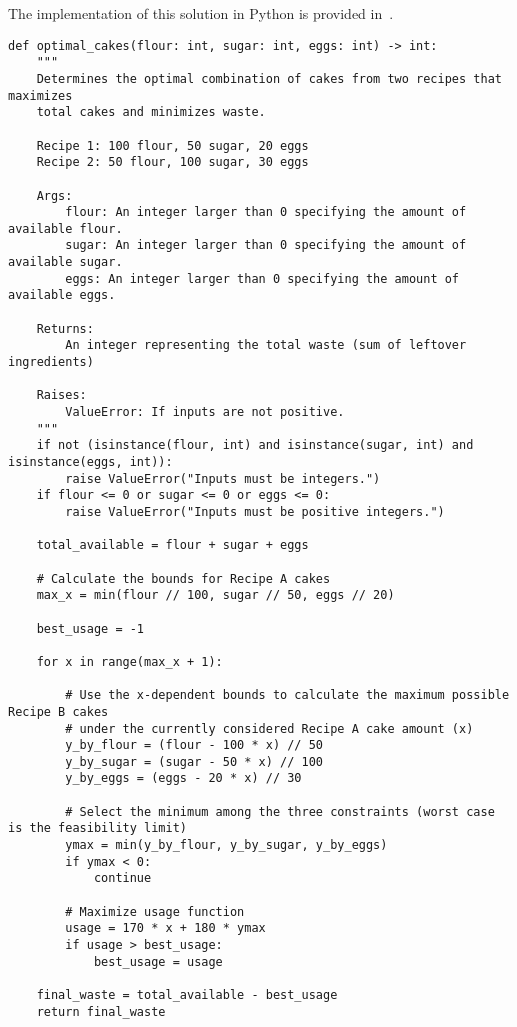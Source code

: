 \documentclass{solutionclass} %
\begin{document}
    The implementation of this solution in Python is provided in~.

    \clearpage

    \begin{lstlisting}[style=pythonstyle, caption={Python implementation of the solution for Problem A.1: Optimal Cake Production}, label={lst:problem_a_solution}]
def optimal_cakes(flour: int, sugar: int, eggs: int) -> int:
    """
    Determines the optimal combination of cakes from two recipes that maximizes
    total cakes and minimizes waste.

    Recipe 1: 100 flour, 50 sugar, 20 eggs
    Recipe 2: 50 flour, 100 sugar, 30 eggs

    Args:
        flour: An integer larger than 0 specifying the amount of available flour.
        sugar: An integer larger than 0 specifying the amount of available sugar.
        eggs: An integer larger than 0 specifying the amount of available eggs.

    Returns:
        An integer representing the total waste (sum of leftover ingredients)

    Raises:
        ValueError: If inputs are not positive.
    """
    if not (isinstance(flour, int) and isinstance(sugar, int) and isinstance(eggs, int)):
        raise ValueError("Inputs must be integers.")
    if flour <= 0 or sugar <= 0 or eggs <= 0:
        raise ValueError("Inputs must be positive integers.")

    total_available = flour + sugar + eggs

    # Calculate the bounds for Recipe A cakes
    max_x = min(flour // 100, sugar // 50, eggs // 20)

    best_usage = -1

    for x in range(max_x + 1):

        # Use the x-dependent bounds to calculate the maximum possible Recipe B cakes
        # under the currently considered Recipe A cake amount (x)
        y_by_flour = (flour - 100 * x) // 50
        y_by_sugar = (sugar - 50 * x) // 100
        y_by_eggs = (eggs - 20 * x) // 30

        # Select the minimum among the three constraints (worst case is the feasibility limit)
        ymax = min(y_by_flour, y_by_sugar, y_by_eggs)
        if ymax < 0:
            continue

        # Maximize usage function
        usage = 170 * x + 180 * ymax
        if usage > best_usage:
            best_usage = usage

    final_waste = total_available - best_usage
    return final_waste
    \end{lstlisting}
\end{document}

